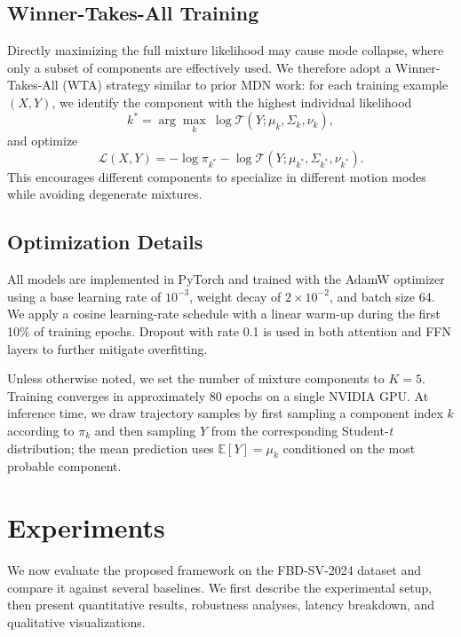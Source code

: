 \documentclass[journal]{IEEEtran}
\begin{document}
\subsection{Winner-Takes-All Training}

Directly maximizing the full mixture likelihood may cause mode collapse, where only a subset of components are effectively used. We therefore adopt a Winner-Takes-All (WTA) strategy similar to prior MDN work: for each training example $(X, Y)$, we identify the component with the highest individual likelihood
\[
k^* = \arg\max_k \ \log \mathcal{T}(Y; \mu_k, \Sigma_k, \nu_k),
\]
and optimize
\begin{equation}
	\mathcal{L}(X,Y) = -\log \pi_{k^*} - \log \mathcal{T}(Y; \mu_{k^*}, \Sigma_{k^*}, \nu_{k^*}).
\end{equation}
This encourages different components to specialize in different motion modes while avoiding degenerate mixtures.

\subsection{Optimization Details}

All models are implemented in PyTorch \cite{Paszke2019PyTorch} and trained with the AdamW optimizer \cite{Loshchilov2019AdamW} using a base learning rate of $10^{-3}$, weight decay of $2\times 10^{-2}$, and batch size 64. We apply a cosine learning-rate schedule with a linear warm-up during the first 10\% of training epochs. Dropout with rate 0.1 is used in both attention and FFN layers to further mitigate overfitting.

Unless otherwise noted, we set the number of mixture components to $K=5$. Training converges in approximately 80 epochs on a single NVIDIA GPU. At inference time, we draw trajectory samples by first sampling a component index $k$ according to $\pi_k$ and then sampling $Y$ from the corresponding Student-\textit{t} distribution; the mean prediction uses $\mathbb{E}[Y] = \mu_k$ conditioned on the most probable component.
\section{Experiments}
\label{sec:experiments}

We now evaluate the proposed framework on the FBD-SV-2024 dataset and compare it against several baselines. We first describe the experimental setup, then present quantitative results, robustness analyses, latency breakdown, and qualitative visualizations.
\end{document}
